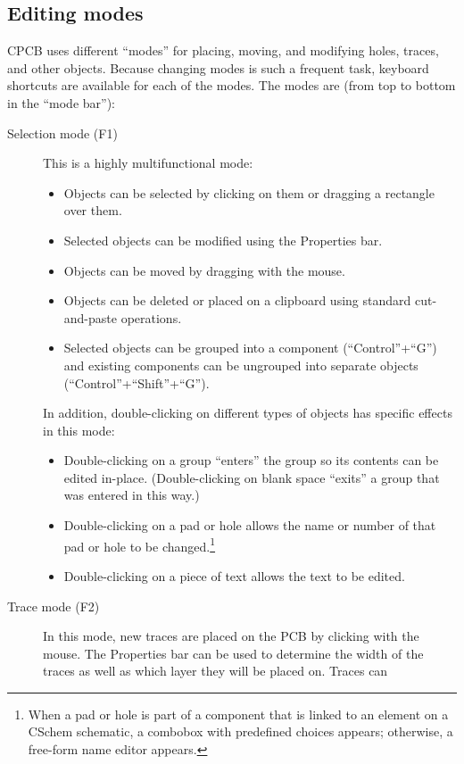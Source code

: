 \documentclass[11pt]{report}
\def\pls{+\discretionary{}{}{}}
\begin{document}
\subsection{Editing modes}
CPCB uses different ``modes'' for placing, moving, and modifying holes, traces,
and other objects. Because changing modes is such a frequent task,
keyboard shortcuts are available for each of the modes. The modes are
(from top to bottom in the ``mode bar''):
\begin{description}
\item[Selection mode (F1)]This is a highly multifunctional mode:
  \begin{itemize}
  \item Objects can be selected by
    clicking on them or dragging a rectangle over them.
  \item Selected objects can be modified using the Properties bar.
  \item Objects can be moved by dragging with the mouse.
  \item Objects can be deleted or placed on a clipboard using
    standard cut-and-paste operations.
  \item Selected objects can be grouped into a component
    (``Control''\pls``G'') and existing components can be ungrouped
    into separate objects (``Control''\pls``Shift''\pls``G'').
  \end{itemize}
  In addition, double-clicking on different types of objects has
  specific effects in this mode:
  \begin{itemize}
    \item Double-clicking on a group ``enters'' the group so its
      contents can be edited in-place. (Double-clicking on blank space
      ``exits'' a group that was entered in this way.)
    \item Double-clicking on a pad or hole allows the name or number
      of that pad or hole to be changed.\footnote{When a pad or hole
        is part of a component that is linked to an element on a
        CSchem schematic, a combobox with predefined choices appears;
        otherwise, a free-form name editor appears.}
      \item Double-clicking on a piece of text allows the text to be
        edited.
  \end{itemize}
  \item[Trace mode (F2)] In this mode, new traces are placed on the
    PCB by clicking with the mouse. The Properties bar can be used to determine the width of the
    traces as well as which layer they will be placed on. Traces can

\end{description}
\end{document}
